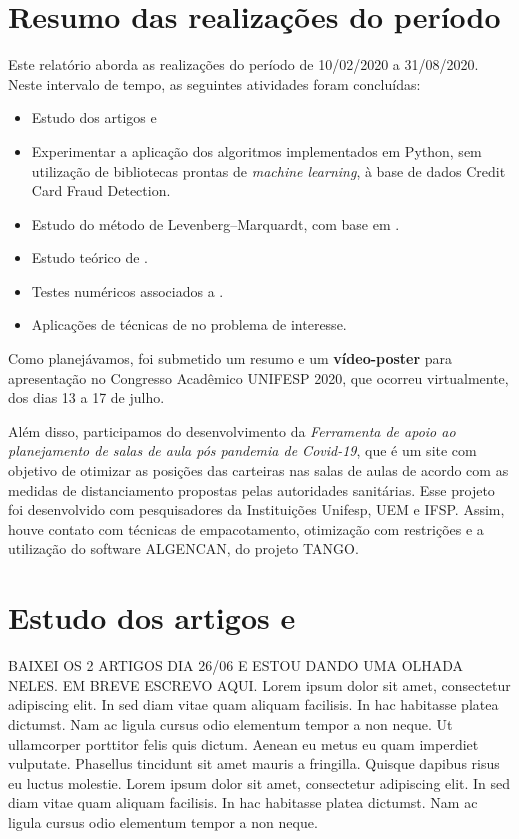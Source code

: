 \documentclass[11pt]{article}
\begin{document}
\section*{Resumo das realizações do período}
Este relatório aborda as realizações do período de 10/02/2020 a 31/08/2020. Neste intervalo de tempo, as seguintes atividades foram concluídas:

\begin{itemize}
\item Estudo dos artigos \cite{fraudeItalia1} e \cite{fraudeItalia2}
\item Experimentar a aplicação dos algoritmos implementados em Python, sem utilização de bibliotecas prontas de \textit{machine learning}, à base de dados Credit Card Fraud Detection.

\item Estudo do método de Levenberg–Marquardt, com base em \cite{TCCKleber}.
\item Estudo teórico de \cite{bmLS}. 
\item Testes numéricos associados a \cite{bmLS}.
\item Aplicações de técnicas de \cite{bmLS} no problema de interesse.
\end{itemize}


Como planejávamos, foi submetido um resumo e um \textbf{vídeo-poster} para apresentação no Congresso Acadêmico UNIFESP 2020, que ocorreu virtualmente, dos dias 13 a 17 de julho.

Além disso, participamos do desenvolvimento da \textit{Ferramenta de apoio ao planejamento de salas de aula pós pandemia de Covid-19}, que é um site com objetivo de otimizar as posições das carteiras nas salas de aulas de acordo com as medidas de distanciamento propostas pelas autoridades sanitárias. Esse projeto foi desenvolvido com pesquisadores da Instituições Unifesp, UEM e IFSP. Assim, houve contato com técnicas de empacotamento, otimização com restrições e a utilização do software ALGENCAN, do projeto TANGO\supercite{TANGO}.
\section{Estudo dos artigos \cite{fraudeItalia1} e \cite{fraudeItalia2}}
BAIXEI OS 2 ARTIGOS DIA 26/06 E ESTOU DANDO UMA OLHADA NELES. EM BREVE ESCREVO AQUI.
Lorem ipsum dolor sit amet, consectetur adipiscing elit. In sed diam vitae quam aliquam facilisis. In hac habitasse platea dictumst. Nam ac ligula cursus odio elementum tempor a non neque. Ut ullamcorper porttitor felis quis dictum. Aenean eu metus eu quam imperdiet vulputate. Phasellus tincidunt sit amet mauris a fringilla. Quisque dapibus risus eu luctus molestie. Lorem ipsum dolor sit amet, consectetur adipiscing elit. In sed diam vitae quam aliquam facilisis. In hac habitasse platea dictumst. Nam ac ligula cursus odio elementum tempor a non neque. 
\end{document}
